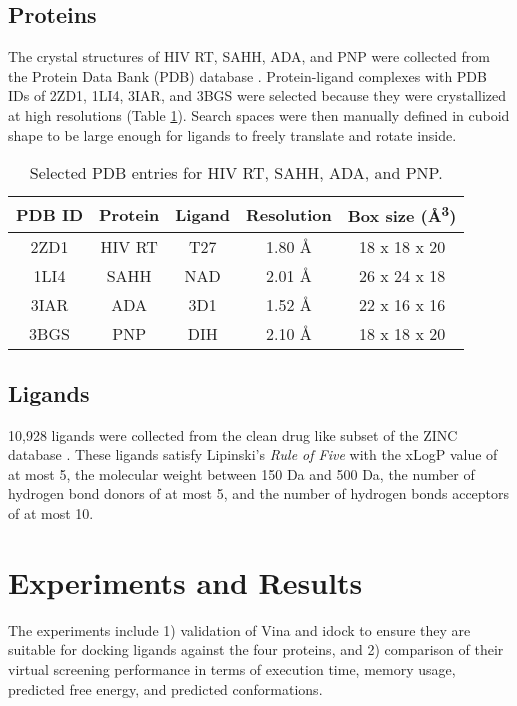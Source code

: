 \documentclass[10pt, conference, compsocconf]{../IEEEtran}
\begin{document}
\subsection{Proteins}

The crystal structures of HIV RT, SAHH, ADA, and PNP were collected from the Protein Data Bank (PDB) database \cite{539,537}. Protein-ligand complexes with PDB IDs of 2ZD1, 1LI4, 3IAR, and 3BGS were selected because they were crystallized at high resolutions (Table \ref{tab:SelectedPDBEntries}). Search spaces were then manually defined in cuboid shape to be large enough for ligands to freely translate and rotate inside.

\begin{table}
\centering
\begin{tabular*}
{\linewidth}
{@{\extracolsep{\fill}}ccccc}
\toprule
PDB ID & Protein & Ligand & Resolution & Box size (\AA\textsuperscript{3})\\
\midrule
2ZD1 & HIV RT & T27 & 1.80 \AA & 18 x 18 x 20\\
1LI4 & SAHH   & NAD & 2.01 \AA & 26 x 24 x 18\\
3IAR & ADA    & 3D1 & 1.52 \AA & 22 x 16 x 16\\
3BGS & PNP    & DIH & 2.10 \AA & 18 x 18 x 20\\
\bottomrule
\end{tabular*}
\caption{Selected PDB entries for HIV RT, SAHH, ADA, and PNP.}
\label{tab:SelectedPDBEntries}
\end{table}

\subsection{Ligands}

10,928 ligands were collected from the clean drug like subset of the ZINC database \cite{532}. These ligands satisfy Lipinski's \textit{Rule of Five} \cite{169} with the xLogP value of at most 5, the molecular weight between 150 Da and 500 Da, the number of hydrogen bond donors of at most 5, and the number of hydrogen bonds acceptors of at most 10.

\section{Experiments and Results}

The experiments include 1) validation of Vina and idock to ensure they are suitable for docking ligands against the four proteins, and 2) comparison of their virtual screening performance in terms of execution time, memory usage, predicted free energy, and predicted conformations.
\end{document}
